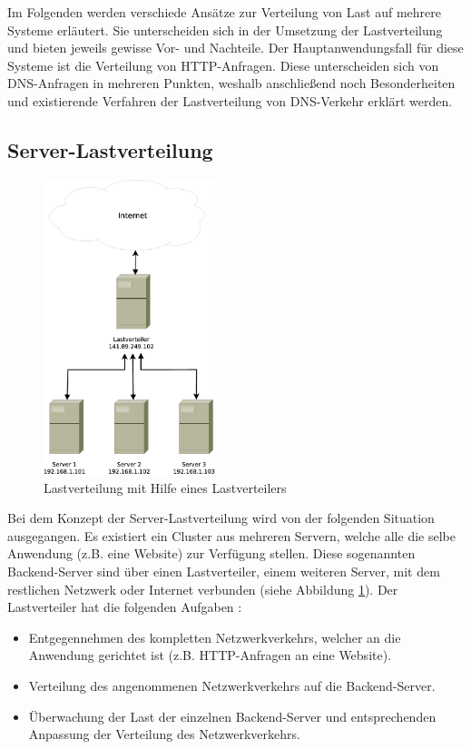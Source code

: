 \documentclass[a4paper, 12pt, BCOR10mm, DIV12, toc=bibliography, toc=listof, german]{scrbook}
\begin{document}
		Im Folgenden werden verschiede Ansätze zur Verteilung von Last auf mehrere Systeme erläutert.
		Sie unterscheiden sich in der Umsetzung der Lastverteilung und bieten jeweils gewisse Vor- und
		Nachteile. Der Hauptanwendungsfall für diese Systeme ist die Verteilung von HTTP-Anfragen.
		Diese unterscheiden sich von DNS-Anfragen in mehreren Punkten, weshalb anschließend noch
		Besonderheiten und existierende Verfahren der Lastverteilung von DNS-Verkehr erklärt werden.
	
			\subsection{Server-Lastverteilung} %
			\label{sub:Server-Lastverteilung}
			
			\begin{figure}
				\centering
				\includegraphics[width=5cm]{images/loadbalancer}
				\caption{Lastverteilung mit Hilfe eines Lastverteilers}
				\label{fig:loadbalancer}
			\end{figure}

			Bei dem Konzept der Server-Lastverteilung wird von der folgenden Situation ausgegangen.  Es
			existiert ein Cluster aus mehreren Servern, welche alle die selbe Anwendung (z.B. eine
			Website) zur Verfügung stellen. Diese sogenannten Backend-Server sind über einen
			Lastverteiler, einem weiteren Server, mit dem restlichen Netzwerk oder Internet verbunden
			(siehe Abbildung \ref{fig:loadbalancer}). Der Lastverteiler hat die folgenden Aufgaben
			\cite{bourke2001}:

			\begin{itemize}
				\item Entgegennehmen des kompletten Netzwerkverkehrs, welcher an die Anwendung gerichtet ist
					(z.B. HTTP-Anfragen an eine Website).
				\item Verteilung des angenommenen Netzwerkverkehrs auf die Backend-Server.
				\item Überwachung der Last der einzelnen Backend-Server und entsprechenden Anpassung der
					Verteilung des Netzwerkverkehrs.
			\end{itemize}
\end{document}
